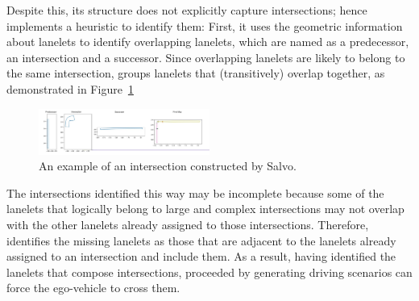 \documentclass[conference]{IEEEtran}
\begin{document}
Despite this, its structure does not explicitly capture intersections; hence \tool implements a heuristic to identify them: First, it uses the geometric information about lanelets to identify overlapping lanelets, which are named as a predecessor, an intersection and a successor. Since overlapping lanelets are likely to belong to the same intersection, \tool groups lanelets that (transitively) overlap together, as demonstrated in Figure~\ref{fig:intersection_a}
%
\begin{figure}[H]
  \centering
    \includegraphics[width=0.5\textwidth]{images/intersection01}
  \caption{An example of an intersection constructed by Salvo.}
  \label{fig:intersection_a}
\end{figure}

The intersections identified this way may be incomplete because some of the lanelets that logically belong to large and complex intersections may not overlap with the other lanelets already assigned to those intersections. Therefore, \tool identifies the missing lanelets as those that are adjacent to the lanelets already assigned to an intersection and include them. As a result, having identified the lanelets that compose intersections, \tool proceeded by generating driving scenarios can force the ego-vehicle to cross them.
\end{document}
